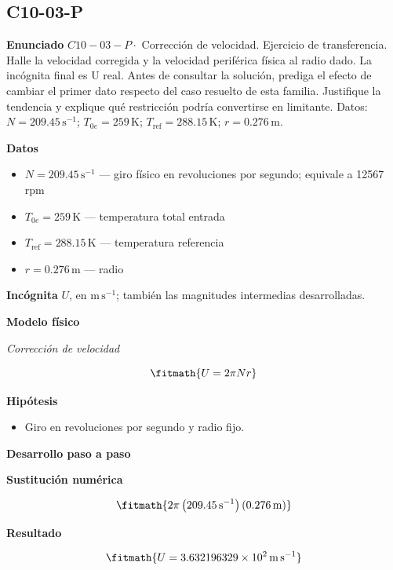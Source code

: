 \documentclass[10pt,openany]{book}
\begin{document}
\subsection*{C10-03-P}

\noindent\textbf{Enunciado}
\(C10-03-P \cdot\) Corrección de velocidad. Ejercicio de transferencia. Halle la velocidad corregida y la velocidad periférica física al radio dado. La incógnita final es U real. Antes de consultar la solución, prediga el efecto de cambiar el primer dato respecto del caso resuelto de esta familia. Justifique la tendencia y explique qué restricción podría convertirse en limitante. Datos: \(N=209.45\, \mathrm{s}^{-1}\); \(T_{0e}=259\, \mathrm{K}\); \(T_{\mathrm{ref}}=288.15\, \mathrm{K}\); \(r=0.276\, \mathrm{m}\).

\noindent\textbf{Datos}
\begin{itemize}
\item $N = 209.45\,\mathrm{s}^{-1}$ — giro físico en revoluciones por segundo; equivale a 12567 rpm
\item $T_{0e} = 259\,\mathrm{K}$ — temperatura total entrada
\item $T_{\mathrm{ref}} = 288.15\,\mathrm{K}$ — temperatura referencia
\item $r = 0.276\,\mathrm{m}$ — radio
\end{itemize}

\noindent\textbf{Incógnita}
$U$, en $\mathrm{m\,s^{-1}}$; también las magnitudes intermedias desarrolladas.

\noindent\textbf{Modelo físico}

\noindent\textit{Corrección de velocidad}

\[
\fitmath{U=2 \pi N r}
\]

\noindent\textbf{Hipótesis}
\begin{itemize}
\item Giro en revoluciones por segundo y radio fijo.
\end{itemize}

\noindent\textbf{Desarrollo paso a paso}



\noindent\textbf{Sustitución numérica}

\[
\fitmath{2 \pi \left(209.45\,\mathrm{s}^{-1}\right) \left(0.276\,\mathrm{m}\right)}
\]

\noindent\textbf{Resultado}

\[
\fitmath{U=3.632196329\times10^{2}\,\mathrm{m}\,\mathrm{s}^{-1}}
\]
\end{document}

